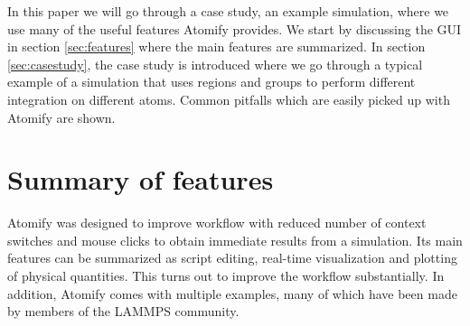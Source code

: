 \documentclass[aps,pre,twocolumn,letterpaper,floatfix,nofootinbib]{revtex4}
\begin{document}
In this paper we will go through a case study, an example simulation, where we
use many of the useful features Atomify provides.
We start by discussing the GUI in section \ref{sec:features} where the main features are summarized.
In section \ref{sec:casestudy}, the case study is introduced where we go through a typical example
of a simulation that uses regions and groups to perform different integration on different atoms.
Common pitfalls which are easily picked up with Atomify are shown.

\section{\label{sec:features}Summary of features}
Atomify was designed to improve workflow with reduced number of
context switches and mouse clicks to obtain immediate results from a simulation.
Its main features can be summarized as script editing,
real-time visualization and plotting of physical quantities.
This turns out to improve the workflow substantially.
In addition, Atomify comes with multiple examples,
many of which have been made by members of the LAMMPS community.
\end{document}
